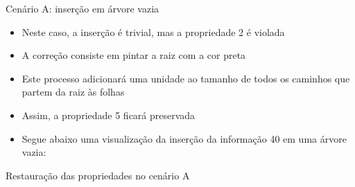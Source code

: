 \begin{frame}[fragile]{Cenário A: inserção em árvore vazia}

    \begin{itemize}
        \item Neste caso, a inserção é trivial, mas a propriedade 2 é violada

        \item A correção consiste em pintar a raiz com a cor preta

        \item Este processo adicionará uma unidade ao tamanho de todos os caminhos que 
            partem da raiz às folhas

        \item Assim, a propriedade 5 ficará preservada

        \item Segue abaixo uma visualização da inserção da informação 40 em uma árvore vazia:
    \end{itemize}

    \begin{figure}
    \centering
    \end{figure}

\end{frame}

\begin{frame}[fragile]{Restauração das propriedades no cenário A}
\end{frame}

